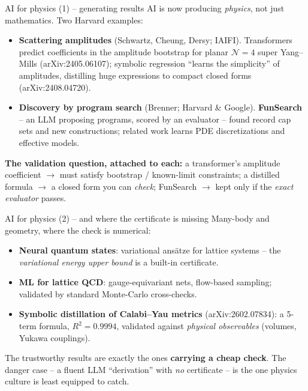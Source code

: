 \documentclass[aspectratio=169,xcolor=dvipsnames]{beamer}
\begin{document}
\begin{frame}{AI for physics (1) -- generating results}
AI is now producing \emph{physics}, not just mathematics. Two Harvard examples:
\smallskip
\begin{itemize}
  \item \textbf{Scattering amplitudes} (Schwartz, Cheung, Dersy; IAIFI).
        Transformers predict coefficients in the amplitude bootstrap for planar
        $\mathcal{N}=4$ super Yang--Mills (arXiv:2405.06107); symbolic regression
        ``learns the simplicity'' of amplitudes, distilling huge expressions to
        compact closed forms (arXiv:2408.04720).
  \item \textbf{Discovery by program search} (Brenner; Harvard \& Google).
        \textbf{FunSearch} -- an LLM proposing programs, scored by an evaluator --
        found record cap sets and new constructions; related work learns PDE
        discretizations and effective models.
\end{itemize} \pause
\smallskip
\textbf{The validation question, attached to each:} a transformer's amplitude
coefficient $\to$ must satisfy bootstrap / known-limit constraints; a distilled
formula $\to$ a closed form you can \emph{check}; FunSearch $\to$ kept only if the
\emph{exact evaluator} passes.
\end{frame}

\begin{frame}{AI for physics (2) -- and where the certificate is missing}
Many-body and geometry, where the check is numerical:
\begin{itemize}
  \item \textbf{Neural quantum states}: variational ans\"atze for lattice systems --
        the \emph{variational energy upper bound} is a built-in certificate.
  \item \textbf{ML for lattice QCD}: gauge-equivariant nets, flow-based sampling;
        validated by standard Monte-Carlo cross-checks.
  \item \textbf{Symbolic distillation of Calabi--Yau metrics} (arXiv:2602.07834):
        a 5-term formula, $R^2=0.9994$, validated against \emph{physical observables}
        (volumes, Yukawa couplings).
\end{itemize} \pause
\smallskip
The trustworthy results are exactly the ones \textbf{carrying a cheap check}.
The danger case -- a fluent LLM ``derivation'' with \emph{no} certificate -- is
the one physics culture is least equipped to catch.
\end{frame}
\end{document}
